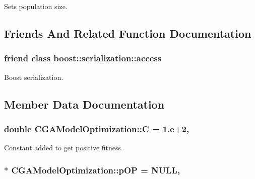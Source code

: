 Sets population size. 



\subsection{Friends And Related Function Documentation}
\hypertarget{class_c_g_a_model_optimization_ac98d07dd8f7b70e16ccb9a01abf56b9c}{
\subsubsection[{boost\-::serialization\-::access}]{\setlength{\rightskip}{0pt plus 5cm}friend class boost\-::serialization\-::access\hspace{0.3cm}{\ttfamily [friend]}}}\label{class_c_g_a_model_optimization_ac98d07dd8f7b70e16ccb9a01abf56b9c}


Boost serialization. 



\subsection{Member Data Documentation}
\hypertarget{class_c_g_a_model_optimization_ab1915d63ecd7b920e93e3171724f3e71}{
\subsubsection[{C}]{\setlength{\rightskip}{0pt plus 5cm}double C\-G\-A\-Model\-Optimization\-::\-C = 1.e+2\hspace{0.3cm}{\ttfamily [static]}, {\ttfamily [protected]}}}\label{class_c_g_a_model_optimization_ab1915d63ecd7b920e93e3171724f3e71}


Constant added to get positive fitness. 

\hypertarget{class_c_g_a_model_optimization_a6b925befb13a952f6f8bae588cce6106}{
\subsubsection[{p\-O\-P}]{ $\ast$ C\-G\-A\-Model\-Optimization\-::p\-O\-P = N\-U\-L\-L\hspace{0.3cm}{\ttfamily [static]}, {\ttfamily [protected]}}}\label{class_c_g_a_model_optimization_a6b925befb13a952f6f8bae588cce6106}


